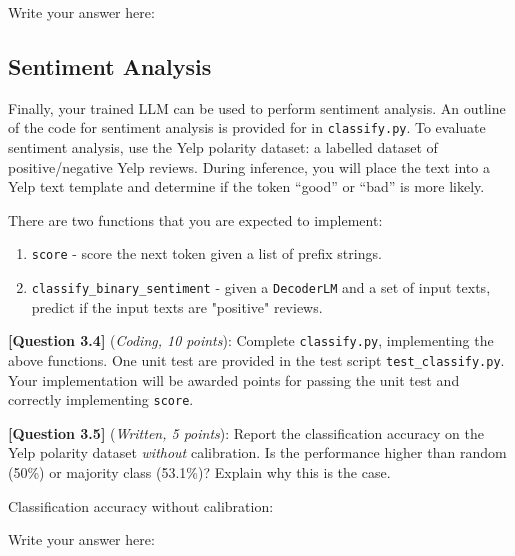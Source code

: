 \documentclass[leqno,12pt]{article}
\begin{document}
\noindent
Write your answer here:
\begin{tcolorbox}[fit,height=4cm, width=\linewidth, blank, borderline={1pt}{-2pt}]
\end{tcolorbox}

\subsection*{Sentiment Analysis}

Finally, your trained LLM can be used to perform sentiment analysis. An outline of the code for sentiment analysis is provided for in \texttt{classify.py}. To evaluate sentiment analysis, use the Yelp polarity dataset: a labelled dataset of positive/negative Yelp reviews. During inference, you will place the text into a Yelp text template and determine if the token ``good'' or ``bad'' is more likely.

\noindent There are two functions that you are expected to implement:
\begin{enumerate}
    \item \texttt{score} - score the next token given a list of prefix strings.
    \item \texttt{classify\_binary\_sentiment} - given a \texttt{DecoderLM} and a set of input texts, predict if the input texts are "positive" reviews.
\end{enumerate}

\noindent \textbf{[Question 3.4]} (\emph{Coding, 10 points}): Complete \texttt{classify.py}, implementing the above functions. 
One unit test are provided in the test script \texttt{test\_classify.py}. Your implementation will be awarded points for passing the unit test and correctly implementing \texttt{score}.
\newline
\clearpage

\noindent \textbf{[Question 3.5]} (\emph{Written, 5 points}): Report the classification accuracy on the Yelp polarity dataset \emph{without} calibration. Is the performance higher than random (50\%) or majority class (53.1\%)? Explain why this is the case.

\noindent
Classification accuracy without calibration:
\begin{tcolorbox}[fit,height=1cm, width=4cm, blank, borderline={1pt}{-2pt}]
\end{tcolorbox}

\noindent
Write your answer here:
\begin{tcolorbox}[fit,height=2cm, width=\linewidth, blank, borderline={1pt}{-2pt}]
\end{tcolorbox}
\end{document}
